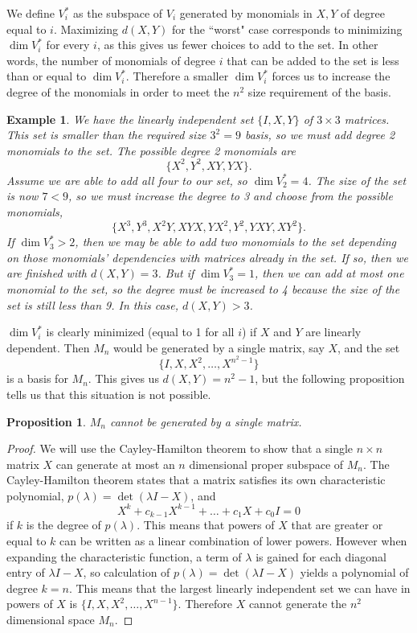 \documentclass[11pt]{amsart}
\newtheorem{proposition}[theorem]{Proposition}
\numberwithin{equation}{section}
\numberwithin{figure}{section}
\numberwithin{theorem}{section}
\newtheorem{example}{Example}
\begin{document}
We define $V^*_i$ as the subspace of $V_i$ generated by monomials in $X,Y$ of degree equal to $i$. Maximizing $d(X,Y)$ for the ``worst" case corresponds to minimizing $\dim V^*_i$ for every $i$, as this gives us fewer choices to add to the set. In other words, the number of monomials of degree $i$ that can be added to the set is less than or equal to $\dim V^*_i$. Therefore a smaller $\dim V^*_i$ forces us to increase the degree of the monomials in order to meet the $n^2$ size requirement of the basis. 
\begin{example}
We have the linearly independent set $\{I,X,Y\}$ of $3\times3$ matrices. This set is smaller than the required size $3^2=9$ basis, so we must add degree 2 monomials to the set. The possible degree 2 monomials are $$\{X^2,Y^2,XY,YX\}.$$ Assume we are able to add all four to our set, so $\dim V^*_2=4$. The size of the set is now $7<9$, so we must increase the degree to 3 and choose from the possible monomials, $$\{X^3,Y^3,X^2Y,XYX,YX^2,Y^2,YXY,XY^2\}.$$ If $\dim V^*_3>2$, then we may be able to add two monomials to the set depending on those monomials' dependencies with matrices already in the set. If so, then we are finished with $d(X,Y)=3$. But if $\dim V^*_3=1$, then we can add at most one monomial to the set, so the degree must be increased to 4 because the size of the set is still less than 9. In this case, $d(X,Y)>3$.  
\end{example}
$\dim V^*_i$ is clearly minimized (equal to 1 for all $i$) if $X$ and $Y$ are linearly dependent. Then $M_n$ would be generated by a single matrix, say $X$, and the set $$\{I,X,X^2,\ldots,X^{n^2-1}\}$$ is a basis for $M_n$. This gives us $d(X,Y)=n^2-1$, but the following proposition tells us that this situation is not possible. 
\begin{proposition}
$M_n$ cannot be generated by a single matrix. 
\end{proposition}
\begin{proof}
We will use the Cayley-Hamilton theorem to show that a single $n\times n$ matrix $X$ can generate at most an $n$ dimensional proper subspace of $M_n$. The Cayley-Hamilton theorem states that a matrix satisfies its own characteristic polynomial, $p(\lambda)=\det(\lambda I-X)$, and $$X^k+c_{k-1}X^{k-1}+\ldots+c_1X+c_0I=0$$ if $k$ is the degree of $p(\lambda)$. This means that powers of $X$ that are greater or equal to $k$ can be written as a linear combination of lower powers. However when expanding the characteristic function, a term of $\lambda$ is gained for each diagonal entry of $\lambda I-X$, so calculation of $p(\lambda)=\det(\lambda I-X)$ yields a polynomial of degree $k= n$. This means that the largest linearly independent set we can have in powers of $X$ is $\{I,X,X^2,\ldots,X^{n-1}\}$. Therefore $X$ cannot generate the $n^2$ dimensional space $M_n$.  
\end{proof}
\end{document}
